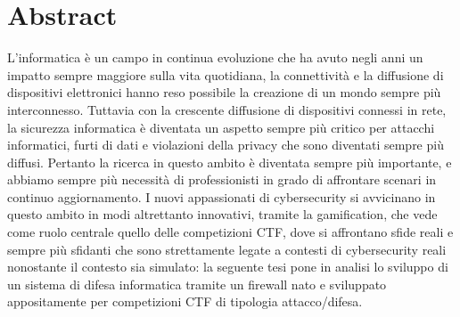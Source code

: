 \chapter*{Abstract}

L'informatica è un campo in continua evoluzione che ha avuto negli anni un impatto sempre maggiore sulla vita quotidiana, la connettività e la diffusione
di dispositivi elettronici hanno reso possibile la creazione di un mondo sempre più interconnesso.
Tuttavia con la crescente diffusione di dispositivi connessi in rete, la sicurezza informatica è diventata un aspetto sempre più critico 
per attacchi informatici, furti di dati e violazioni della privacy che sono diventati sempre più diffusi.
Pertanto la ricerca in questo ambito è diventata sempre più importante, e abbiamo sempre più necessità di professionisti
in grado di affrontare scenari in continuo aggiornamento.
I nuovi appassionati di cybersecurity si avvicinano in questo ambito in modi altrettanto innovativi, tramite la gamification,
che vede come ruolo centrale quello delle competizioni CTF, dove si affrontano sfide reali e sempre più sfidanti
che sono strettamente legate a contesti di cybersecurity reali nonostante il contesto sia simulato:
la seguente tesi pone in analisi lo sviluppo di un sistema di difesa informatica tramite un firewall nato e sviluppato
appositamente per competizioni CTF di tipologia attacco/difesa.